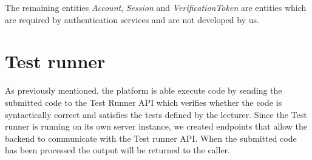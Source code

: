 The remaining entities \textit{Account}, \textit{Session} and \textit{VerificationToken} are entities which are required by authentication services and are not developed by us.

\section{Test runner}
As previously mentioned, the platform is able execute code by sending the submitted code to the Test Runner API which verifies whether the code is syntactically correct and satisfies the tests defined by the lecturer.
Since the Test runner is running on its own server instance, we created endpoints that allow the backend to communicate with the Test runner API. When the submitted code has been processed the output will be returned to the caller.
